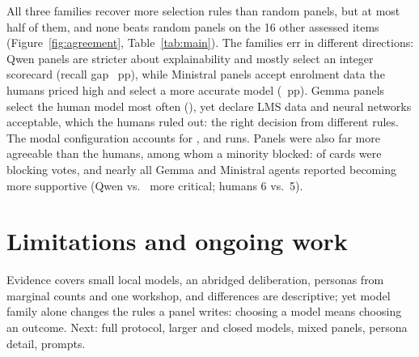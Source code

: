 \documentclass[11pt,a4paper]{article}
\begin{document}
All three families recover more selection rules than random panels, but at most half of them, and none beats random panels on the 16 other assessed items (Figure~\ref{fig:agreement}, Table~\ref{tab:main}).
The families err in different directions: Qwen panels are stricter about explainability and mostly select an integer scorecard (recall gap \recallGapQwen{}~pp), while Ministral panels accept enrolment data the humans priced high and select a more accurate model (\recallGapMinistral{}~pp).
Gemma panels select the human model most often (\decisionGemma{}), yet declare LMS data and neural networks acceptable, which the humans ruled out: the right decision from different rules.
The modal configuration accounts for \modalQwen{}, \modalGemma{} and \modalMinistral{} runs.
Panels were also far more agreeable than the humans, among whom a minority blocked: \blockCards{} of \nCards{} cards were blocking votes, and nearly all Gemma and Ministral agents reported becoming more supportive (Qwen \moreSupportiveQwen{} vs.\ \moreCriticalQwen{} more critical; humans 6 vs.\ 5).

\section{Limitations and ongoing work}
Evidence covers small local models, an abridged deliberation, personas from marginal counts and one workshop, and differences are descriptive; yet model family alone changes the rules a panel writes: choosing a model means choosing an outcome.
Next: full protocol, larger and closed models, mixed panels, persona detail, prompts.


\end{document}
